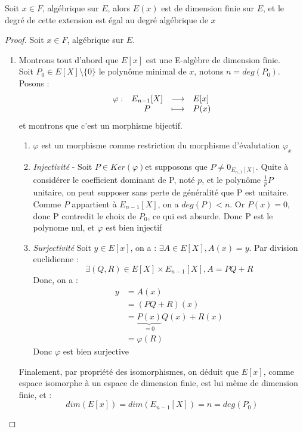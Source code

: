 \documentclass[a4paper,12pt,french]{report}
\begin{document}
			\begin{proposition}
				Soit \(x \in F \), algébrique sur \(E\), alors \(E(x)\) est de dimension finie sur \(E\), et le degré de cette extension est égal au degré algébrique de \(x\){}
			\end{proposition}
				\begin{proof}
					Soit \(x \in F \), algébrique sur \(E\).{}
					
	\begin{enumerate}
		\item Montrons tout d'abord que $E[x]$ est une E-algèbre de dimension finie.\\ 
						Soit \(P_{0} \in E[X]\setminus\{0\} \) le polynôme minimal de $x$, notons \(n = deg(P_{0})\).
					Posons : 
					\[{}
						\begin{array}[t]{lccl}
							\varphi : 
							& E_{n-1}[X] & \longrightarrow & E[x] \\
							& P & \longmapsto & P(x)
						\end{array}
					\] et montrons que c'est un morphisme bijectif.
					
					\begin{enumerate}
						\item $\varphi$ est un morphisme comme restriction du morphisme d'évalutation $\varphi_{x}$
						\item \emph{Injectivité} - Soit \(P \in Ker(\varphi)\)et supposons que \(P \neq 0_{E_{{n_-1}}[X]} \). Quite à considérer le coefficient dominant de P, noté \(p\), et le polynôme \(\frac{1}{p}P\) unitaire, on peut supposer sans perte de généralité que P est unitaire. Comme \(P\) appartient à \(E_{n-1}[X]\), on a \(deg(P) < n\). Or \(P(x) = 0\), donc P contredit le choix de \(P_{0}\), ce qui est absurde. Donc P est le polynome nul, et \(\varphi\) est bien injectif
						
						\item \emph{Surjectivité}
						Soit $y \in E[x]$, on a : $\exists A \in E[X], A(x) = y$. Par division euclidienne : 
						\[{}
							\exists (Q,R) \in E[X] \times E_{n-1}[X] , A = PQ + R
						\]
						Donc, on a :
						\[{}
						\begin{aligned}
							y &= A(x) \\
							&= (PQ + R)(x)\\
							&=\underbrace{P(x)}_{=0}Q(x) + R(x)\\
							&=\varphi(R)
						\end{aligned}
						\]
						Donc $\varphi$ est bien surjective
					\end{enumerate}
				Finalement, par propriété des isomorphismes, on déduit que $E[x]$, comme espace isomorphe à un espace de dimension finie, est lui même de dimension finie, et :
				\[{}
				dim(E[x]) = dim(E_{n-1}[X]) = n = deg(P_{0})
				\]
		

\end{enumerate}
\end{proof}
\end{document}
